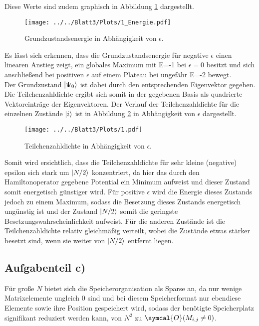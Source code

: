 Diese Werte sind zudem graphisch in Abbildung \ref{fig:Energie}
dargestellt.
\begin{figure}[H]
  \texttt{[image: ../../Blatt3/Plots/1\_Energie.pdf]}
  \caption{Grundzustandsenergie in Abhängigkeit von $\epsilon$.}
  \label{fig:Energie}
\end{figure}
Es lässt sich erkennen, dass die Grundzustandsenergie für negative $\epsilon$ einen
linearen Anstieg zeigt, ein globales Maximum mit E=-1 bei $\epsilon=0$ besitzt
und sich anschließend bei positiven $\epsilon$ auf einem Plateau bei ungefähr E=-2 bewegt. \\
Der Grundzustand $\lvert\Psi_0\rangle$ ist dabei durch den entsprechenden Eigenvektor gegeben. Die Teilchenzahldichte ergibt sich somit in der gegebenen Basis als quadrierte Vektoreinträge der Eigenvektoren.
Der Verlauf der Teilchenzahldichte für die einzelnen Zustände $\lvert i\rangle$ ist in Abbildung \ref{fig:dichte} in Abhängigkeit von $\epsilon$
dargestellt.
\begin{figure}[H]
  \texttt{[image: ../../Blatt3/Plots/1.pdf]}
  \caption{Teilchenzahldichte in Abhängigkeit von $\epsilon$.}
  \label{fig:dichte}
\end{figure}
Somit wird ersichtlich, dass die Teilchenzahldichte für sehr kleine (negative) epsilon sich stark
um $\lvert N/2\rangle$ konzentriert, da hier das durch den Hamiltonoperator gegebene Potential ein Minimum aufweist und dieser Zustand somit energetisch günstiger wird.
Für positive $\epsilon$ wird die Energie dieses Zustands jedoch zu einem Maximum, sodass die Besetzung dieses Zustands energetisch ungünstig ist und der Zustand $\lvert N/2\rangle$ somit die geringste Besetzungswahrscheinlichkeit aufweist. Für die anderen Zustände ist die Teilchenzahldichte relativ gleichmäßig verteilt, wobei die Zustände
etwas stärker besetzt sind, wenn sie weiter von $\lvert N/2\rangle$ entfernt liegen.

\subsection*{Aufgabenteil c)}
Für große $N$ bietet sich die Speicherorganisation als Sparse an, da nur wenige Matrixelemente ungleich 0 sind und bei diesem Speicherformat nur ebendiese Elemente sowie ihre Position gespeichert wird, sodass
der benötigte Speicherplatz signifikant reduziert werden kann, von $N^2$ zu $\symcal{O}(M_{i,j}\neq0)$.
